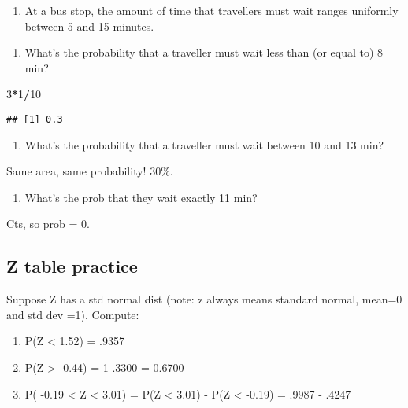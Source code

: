 \documentclass[]{article}
\newenvironment{Shaded}{\begin{snugshade}}{\end{snugshade}}
\newcommand{\DecValTok}[1]{\textcolor[rgb]{0.00,0.00,0.81}{#1}}
\newcommand{\OperatorTok}[1]{\textcolor[rgb]{0.81,0.36,0.00}{\textbf{#1}}}
\providecommand{\tightlist}{%
  \setlength{\itemsep}{0pt}\setlength{\parskip}{0pt}}
\begin{document}
\begin{enumerate}
\def\labelenumi{\arabic{enumi})}
\tightlist
\item
  At a bus stop, the amount of time that travellers must wait ranges
  uniformly between 5 and 15 minutes.
\end{enumerate}

\begin{enumerate}
\def\labelenumi{\alph{enumi})}
\tightlist
\item
  What's the probability that a traveller must wait less than (or equal
  to) 8 min?
\end{enumerate}

\begin{Shaded}
\begin{Highlighting}[]
\DecValTok{3}\OperatorTok{*}\DecValTok{1}\OperatorTok{/}\DecValTok{10}
\end{Highlighting}
\end{Shaded}

\begin{verbatim}
## [1] 0.3
\end{verbatim}

\begin{enumerate}
\def\labelenumi{\alph{enumi})}
\setcounter{enumi}{1}
\tightlist
\item
  What's the probability that a traveller must wait between 10 and 13
  min?
\end{enumerate}

Same area, same probability! 30\%.

\begin{enumerate}
\def\labelenumi{\alph{enumi})}
\setcounter{enumi}{2}
\tightlist
\item
  What's the prob that they wait exactly 11 min?
\end{enumerate}

Cts, so prob = 0.

\hypertarget{z-table-practice}{%
\subsection{Z table practice}\label{z-table-practice}}

Suppose Z has a std normal dist (note: z always means standard normal,
mean=0 and std dev =1). Compute:

\begin{enumerate}
\def\labelenumi{\alph{enumi})}
\item
  P(Z \textless{} 1.52) = .9357
\item
  P(Z \textgreater{} -0.44) = 1-.3300 = 0.6700
\item
  P( -0.19 \textless{} Z \textless{} 3.01) = P(Z \textless{} 3.01) - P(Z
  \textless{} -0.19) = .9987 - .4247
\end{enumerate}
\end{document}
